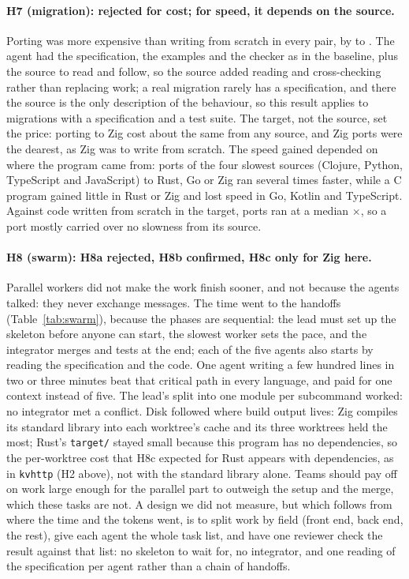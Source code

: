 \documentclass[11pt,a4paper]{article}
\begin{document}
\paragraph{H7 (migration): rejected for cost; for speed, it depends on the source.} Porting was more expensive than
writing from scratch in every pair, by \PortDeltaMin{} to \PortDeltaMax. The agent had the specification,
the examples and the checker as in the baseline, plus the source to read and follow, so the source added
reading and cross-checking rather than replacing work; a real migration rarely has a specification, and
there the source is the only description of the behaviour, so this result applies to migrations with a
specification and a test suite. The target, not the source, set the price: porting to Zig cost about the same
from any source, and Zig ports were the dearest, as Zig was to write from scratch. The speed gained depended on
where the program came from: ports of the four slowest sources (Clojure, Python, TypeScript and JavaScript)
to Rust, Go or Zig ran several times faster, while a C program gained little in Rust or Zig and lost speed in
Go, Kotlin and TypeScript. Against code written from scratch in the target, ports ran at a median
\PortVsScratchMedian$\times$, so a port mostly carried over no slowness from its source.

\paragraph{H8 (swarm): H8a rejected, H8b confirmed, H8c only for Zig here.} Parallel workers did not make
the work finish sooner, and not because the agents talked: they never exchange messages. The time went to
the handoffs (Table~\ref{tab:swarm}), because the phases are sequential: the lead must set up the skeleton before anyone
can start, the slowest worker sets the pace, and the integrator merges and tests at the end; each of the five
agents also starts by reading the specification and the code. One agent writing a few hundred lines in
two or three minutes beat that critical path in every language, and paid for one context instead of five.
The lead's split into one module per subcommand worked: no integrator met a conflict. Disk followed where
build output lives: Zig compiles its standard library into each worktree's cache and its three worktrees held
the most; Rust's \texttt{target/} stayed small because this program has no dependencies, so the per-worktree
cost that H8c expected for Rust appears with dependencies, as in \texttt{kvhttp} (H2 above), not with the
standard library alone. Teams should pay off on work large enough for the parallel part to outweigh the setup
and the merge, which these tasks are not. A design we did not measure, but which follows from where the time
and the tokens went, is to split work by field (front end, back end, the rest), give each agent the whole
task list, and have one reviewer check the result against that list: no skeleton to wait for, no integrator,
and one reading of the specification per agent rather than a chain of handoffs.
\end{document}
